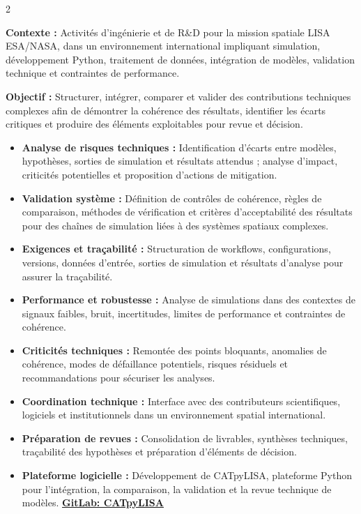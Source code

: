\documentclass[8pt,a4paper,ragged2e,withhyper]{altacv}
\begin{document}
\begin{paracol}{2}
\divider


\textbf{Contexte :} Activités d’ingénierie et de R\&D pour la mission spatiale LISA ESA/NASA, dans un environnement international impliquant simulation, développement Python, traitement de données, intégration de modèles, validation technique et contraintes de performance.

\textbf{Objectif :} Structurer, intégrer, comparer et valider des contributions techniques complexes afin de démontrer la cohérence des résultats, identifier les écarts critiques et produire des éléments exploitables pour revue et décision.

\begin{itemize}
  \item \textbf{Analyse de risques techniques :} Identification d’écarts entre modèles, hypothèses, sorties de simulation et résultats attendus ; analyse d’impact, criticités potentielles et proposition d’actions de mitigation.
  \item \textbf{Validation système :} Définition de contrôles de cohérence, règles de comparaison, méthodes de vérification et critères d’acceptabilité des résultats pour des chaînes de simulation liées à des systèmes spatiaux complexes.
  \item \textbf{Exigences et traçabilité :} Structuration de workflows, configurations, versions, données d’entrée, sorties de simulation et résultats d’analyse pour assurer la traçabilité.
  \item \textbf{Performance et robustesse :} Analyse de simulations dans des contextes de signaux faibles, bruit, incertitudes, limites de performance et contraintes de cohérence.
  \item \textbf{Criticités techniques :} Remontée des points bloquants, anomalies de cohérence, modes de défaillance potentiels, risques résiduels et recommandations pour sécuriser les analyses.
  \item \textbf{Coordination technique :} Interface avec des contributeurs scientifiques, logiciels et institutionnels dans un environnement spatial international.
  \item \textbf{Préparation de revues :} Consolidation de livrables, synthèses techniques, traçabilité des hypothèses et préparation d’éléments de décision.
  \item \textbf{Plateforme logicielle :} Développement de CATpyLISA, plateforme Python pour l’intégration, la comparaison, la validation et la revue technique de modèles.
  \textcolor{DarkPastelRed}{\href{https://gitlab.oca.eu/gboileau/lisa_l3_tools}{\bf GitLab: CATpyLISA}}
\end{itemize}


\end{paracol}
\end{document}
